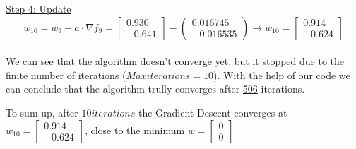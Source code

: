 \underline{Step 4: Update}
\[ 
w_{10} = w_9 - a\cdot \nabla f_9 =  \left[\begin{array}{c}
	0.930\\
	-0.641
\end{array}\right] - \left(\begin{array}{c}
	0.016745 \\
-0.016535
\end{array}\right) \rightarrow
w_{10} = \left[\begin{array}{c}
	0.914\\
	-0.624
\end{array}\right]
\]
\\[4mm]

We can see that the algorithm doesn't converge yet, but it stopped due to the finite number of iterations ($Max iterations = 10$). With the help of our code we can conclude that the algorithm trully converges after \underline{506} iterations.

To sum up, after $10 iterations$ the Gradient Descent converges at $w_{10} = \left[\begin{array}{c}
	0.914\\
	-0.624
\end{array}\right]
$, close to the minimum $w = \left[\begin{array}{c}
	0\\
	0
\end{array}\right]$








